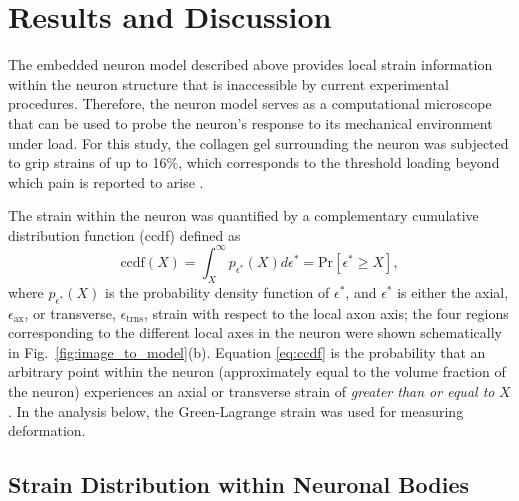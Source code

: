 \documentclass[]{interact}
\begin{document}
\section{Results and Discussion}
\label{sec:results}

The embedded neuron model described above provides local strain information within the neuron structure that is inaccessible by current experimental procedures. Therefore, the neuron model serves as a computational microscope that can be used to probe the  neuron's response to its mechanical environment under load. For this study, the collagen gel surrounding the neuron was subjected to grip strains of up to 16$\%$, which corresponds to the threshold loading beyond which pain is reported to arise \citep{Zhang:2016ga,Zhang:2017gr,Dong:2012bn,Lee:2004jl,Ita:Ys0ulxs9}. 

The strain within the neuron was quantified by a complementary cumulative distribution function (ccdf) defined as 
%
\begin{equation}
\text{ccdf}(X) = \int_{X}^{\infty} p_{\epsilon^*}(X)d\epsilon^* = \text{Pr}[ \epsilon^*\ge X],
\label{eq:ccdf}
\end{equation}
%
where $p_{\epsilon^*}(X)$ is the probability density function of $\epsilon^*$, and $\epsilon^*$ is either the axial, $\epsilon_{\text{ax}}$, or transverse, $\epsilon_{\text{trns}}$, strain with respect to the local axon axis; the four regions corresponding to the different local axes in the neuron were shown schematically in Fig.\ \ref{fig:image_to_model}(b). Equation \ref{eq:ccdf} is the probability that an arbitrary point within the neuron (approximately equal to the volume fraction of the neuron) experiences an axial or transverse strain of \textit{greater than or equal to} $X$. In the analysis below, the Green-Lagrange strain was used for measuring deformation. 

\subsection{Strain Distribution within Neuronal Bodies}
\label{subsec:strain_distribution}
\end{document}
